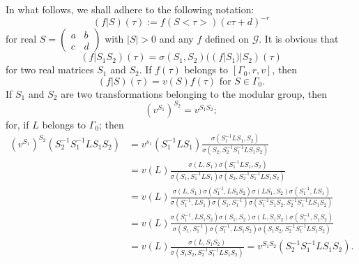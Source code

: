 In what follows, we shall adhere to the following notation:
$$
(f|S)(\tau):= f(S<\tau>)(c\tau+d)^{-r}
$$
for real $S= \left(\begin{smallmatrix}
  a&b\\c&d \end{smallmatrix}\right)$ with $|S|>0$ and any $f$ defined
on $\mathscr{G}$. It is obvious that 
$$
(f|S_1S_2)(\tau) = \sigma(S_1, S_2) ((f|S_1)|S_2)(\tau)
$$
for two real matrices $S_1$ and $S_2$. If $f(\tau)$ belongs to
$[\Gamma_0, r, v]$, then 
$$
(f|S)(\tau) =  v(S)f(\tau) \text{ for } S \in \Gamma_0. 
$$
If $S_1$ and $S_2$ are two transformations belonging to the modular
group, then 
$$
(v^{S_1})^{S_2} = v^{S_1S_2};
$$
for, if $L$ belongs to $\Gamma_0$; then 
{\fontsize{9}{11}\selectfont
\begin{align*}
(v^{S_1})^{S_2}(S^{-1}_2 S^{-1}_1LS_1S_2) & = v^{s_1}(S^{-1}_1LS_1)
  \frac{\sigma(S^{-1}_1 LS_1,S_2)}{\sigma(S_2, S^{-1}_2
    S^{-1}_1LS_1S_2)}\\
& =
  v(L)\frac{\sigma(L,S_1)\sigma(S^{-1}_1LS_1,S_2)}{\sigma(S_1,S^{-1}_1LS_1)
  \sigma(S_2,S^{-1}_2S^{-1}_1 LS_1S_2)}\\
& = v(L)\frac{\sigma(L,S_1) \sigma(S^{-1}_1, L
    S_1S_2)\sigma(LS_1,S_2) \sigma(S^{-1}_1, LS_1)}{\sigma(S^{-1}_1,
    LS_1) \sigma(S_1,S^{-1}_1)\sigma(S^{-1}_1S_1S_2,S^{-1}_2S^{-1}_1 L
    S_1 S_2)} \\
& = v(L) \frac{\sigma(S^{-1}_1, L S_1 S_2) \sigma(S_1, S_2)
    \sigma(L,S_1 S_2) \sigma(S^{-1}_1, S_1 S_2)}{\sigma (S_1,
    S^{-1}_1) \sigma(S^{-1}_1, L S_1 S_2) \sigma(S_1S_2, S^{-1}_2
    S^{-1}_1 L S_1S_2)}\\
& =v(L) \frac{\sigma(L,S_1S_2)}{\sigma(S_1 S_2, S^{-1}_2 S^{-1}_1 L
    S_1 S_2)} = v^{S_1S_2} (S^{-1}_2 S^{-1}_1 L S_1 S_2).
\end{align*}}\relax

